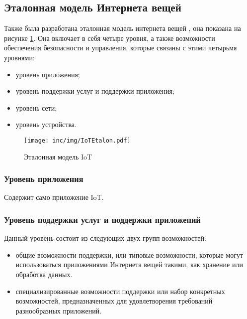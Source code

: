 \subsection{Эталонная модель Интернета вещей}

Также была разработана эталонная модель интернета вещей \cite{itutiot2012}, она 
показана на рисунке \ref{fig:iotetalon}.
Она включает в себя четыре уровня, а также возможности обеспечения безопасности 
и управления, которые связаны с этими четырьмя уровнями:

\begin{itemize}
	\item уровень приложения;
	\item уровень поддержки услуг и поддержки приложения;
	\item уровень сети;
	\item уровень устройства.
\end{itemize}

\begin{figure}
  \centering
  \texttt{[image: inc/img/IoTEtalon.pdf]}
	\caption{Эталонная модель IoT}
  \label{fig:iotetalon}
\end{figure}


\subsubsection{Уровень приложения}

Содержит само приложение IoT.


\subsubsection{Уровень поддержки услуг и поддержки приложений}

Данный уровень состоит из следующих двух групп возможностей:

\begin{itemize}
	\item общие возможности поддержки, или типовые возможности, которые 
могут использоваться приложениями Интернета вещей такими, как хранение или 
обработка данных.
	\item специализированные возможности поддержки или набор конкретных 
возможностей, предназначенных для удовлетворения требований разнообразных 
приложений.
\end{itemize}


